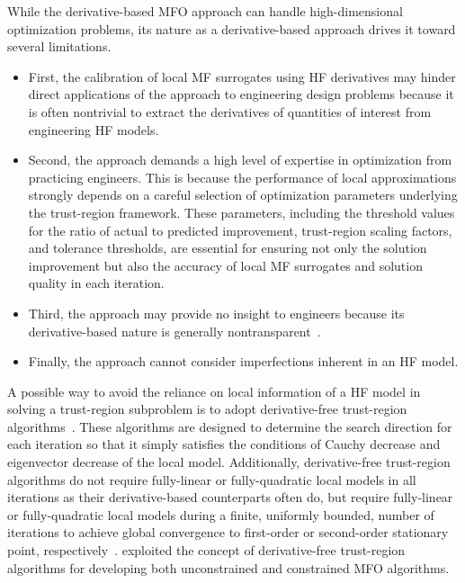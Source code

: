 \documentclass[journal ]{new-aiaa}
\begin{document}
While the derivative-based MFO approach can handle high-dimensional optimization problems, its nature as a derivative-based approach drives it toward several limitations.
\begin{itemize}
	\item First, the calibration of local MF surrogates using HF derivatives may hinder direct applications of the approach to engineering design problems because it is often nontrivial to extract the derivatives of quantities of interest from engineering HF models.
	
	\item Second, the approach demands a high level of expertise in optimization from practicing engineers.
	This is because the performance of local approximations strongly depends on a careful selection of optimization parameters underlying the trust-region framework.
	These parameters, including the threshold values for the ratio of actual to predicted improvement, trust-region scaling factors, and tolerance thresholds, are essential for ensuring not only the solution improvement but also the accuracy of local MF surrogates and solution quality in each iteration.
	
	\item Third, the approach may provide no insight to engineers because its derivative-based nature is generally nontransparent~\citep{Wang2006}.
	
	\item Finally, the approach cannot consider imperfections inherent in an HF model.
\end{itemize}

A possible way to avoid the reliance on local information of a HF model in solving a trust-region subproblem is to adopt derivative-free trust-region algorithms~\citep{Conn2009,Wild2011}.
These algorithms are designed to determine the search direction for each iteration so that it simply satisfies the conditions of Cauchy decrease and eigenvector decrease of the local model.
Additionally, derivative-free trust-region algorithms do not require fully-linear or fully-quadratic local models in all iterations as their derivative-based counterparts often do, but require fully-linear or fully-quadratic local models during a finite, uniformly bounded, number of iterations to achieve global
convergence to first-order or second-order stationary point, respectively~\citep{Conn2009}.
\citet{March2012smo,March2012aiaa} exploited the concept of derivative-free trust-region algorithms for developing both unconstrained and constrained MFO algorithms.
\end{document}
